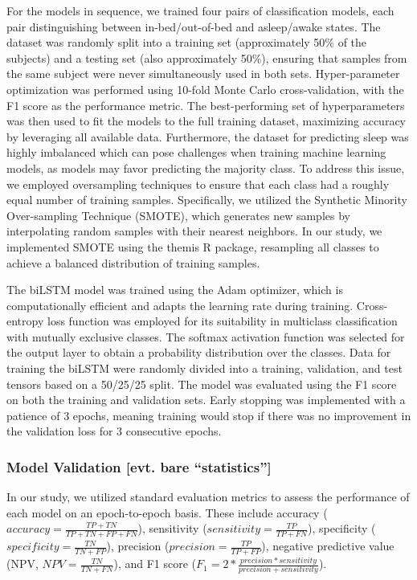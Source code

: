 \documentclass[
  super,
  preprint,
  3p]{elsarticle}
\begin{document}
For the models in sequence, we trained four pairs of classification
models, each pair distinguishing between in-bed/out-of-bed and
asleep/awake states. The dataset was randomly split into a training set
(approximately 50\% of the subjects) and a testing set (also
approximately 50\%), ensuring that samples from the same subject were
never simultaneously used in both sets. Hyper-parameter optimization was
performed using 10-fold Monte Carlo cross-validation, with the F1 score
as the performance metric. The best-performing set of hyperparameters
was then used to fit the models to the full training dataset, maximizing
accuracy by leveraging all available data. Furthermore, the dataset for
predicting sleep was highly imbalanced which can pose challenges when
training machine learning models, as models may favor predicting the
majority class. To address this issue, we employed oversampling
techniques to ensure that each class had a roughly equal number of
training samples. Specifically, we utilized the Synthetic Minority
Over-sampling Technique (SMOTE)\citep{chawla2002}, which generates new
samples by interpolating random samples with their nearest neighbors. In
our study, we implemented SMOTE using the themis R
package\citep{themis}, resampling all classes to achieve a balanced
distribution of training samples.

The biLSTM model was trained using the Adam optimizer, which is
computationally efficient and adapts the learning rate during training.
Cross-entropy loss function was employed for its suitability in
multiclass classification with mutually exclusive classes. The softmax
activation function was selected for the output layer to obtain a
probability distribution over the classes. Data for training the biLSTM
were randomly divided into a training, validation, and test tensors
based on a 50/25/25 split. The model was evaluated using the F1 score on
both the training and validation sets. Early stopping was implemented
with a patience of 3 epochs, meaning training would stop if there was no
improvement in the validation loss for 3 consecutive epochs.

\hypertarget{model-validation-evt.-bare-statistics}{%
\subsubsection{Model Validation {[}evt. bare
``statistics''{]}}\label{model-validation-evt.-bare-statistics}}

In our study, we utilized standard evaluation metrics to assess the
performance of each model on an epoch-to-epoch basis. These include
accuracy (\(accuracy = \frac{TP+TN}{TP+TN+FP+FN}\)), sensitivity
(\(sensitivity = \frac{TP}{TP+FN}\)), specificity
(\(specificity = \frac{TN}{TN+FP}\)), precision
(\(precision = \frac{TP}{TP+FP}\)), negative predictive value (NPV,
\(NPV = \frac{TN}{TN + FN}\)), and F1 score
(\(F_1 = 2 * \frac{precision * sensitivity}{precision + sensitivity}\)).
\end{document}
